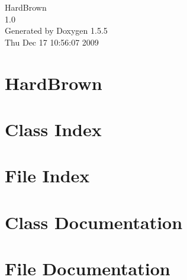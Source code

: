 \documentclass[a4paper]{book}
\begin{document}
\begin{titlepage}
\vspace*{7cm}
\begin{center}
{\Large HardBrown \\[1ex]\large 1.0 }\\
\vspace*{1cm}
{\large Generated by Doxygen 1.5.5}\\
\vspace*{0.5cm}
{\small Thu Dec 17 10:56:07 2009}\\
\end{center}
\end{titlepage}
\clearemptydoublepage
{}
\tableofcontents
\clearemptydoublepage
{}
\chapter{HardBrown }
\label{index}\hypertarget{index}{}
\chapter{Class Index}

\chapter{File Index}

\chapter{Class Documentation}




\chapter{File Documentation}


















\printindex
\end{document}
